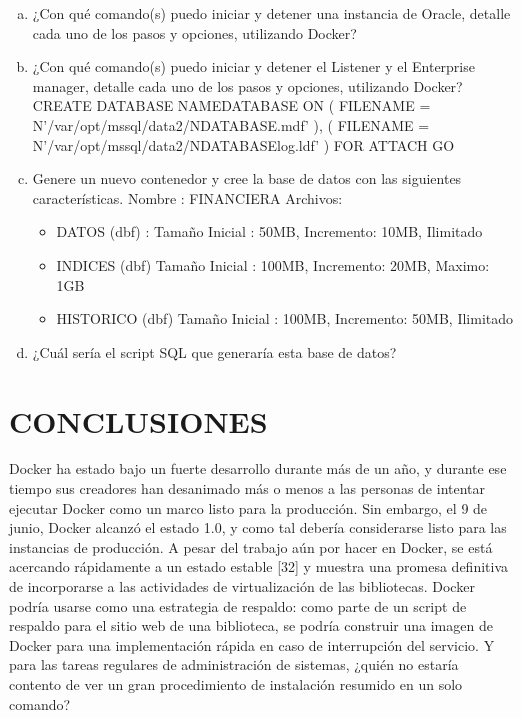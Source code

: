 \documentclass[preprint,12pt]{elsarticle}
\begin{document}
\begin{enumerate}[a)]
\item ¿Con qué comando(s) puedo iniciar y detener una instancia de Oracle, detalle cada uno de los pasos y opciones, utilizando Docker?\newline


\item ¿Con qué comando(s) puedo iniciar y detener el Listener y el Enterprise manager, detalle cada uno de los pasos y opciones, utilizando Docker?\newline
CREATE DATABASE NAMEDATABASE ON \newline
( FILENAME = N'/var/opt/mssql/data2/NDATABASE.mdf' ),\newline
( FILENAME = N'/var/opt/mssql/data2/NDATABASElog.ldf' )\newline
FOR ATTACH\newline
GO\newline
\item Genere un nuevo contenedor y cree la base de datos con las siguientes características.\newline
Nombre : FINANCIERA \newline
Archivos:
\begin{itemize}
\item DATOS (dbf) : Tamaño Inicial : 50MB, Incremento: 10MB, Ilimitado
\item INDICES (dbf) Tamaño Inicial : 100MB, Incremento: 20MB, Maximo: 1GB
\item HISTORICO (dbf) Tamaño Inicial : 100MB, Incremento: 50MB, Ilimitado
\end{itemize}
\item ¿Cuál sería el script SQL que generaría esta base de datos?
\begin{figure}[htb]
	\begin{center}
	\end{center}
\end{figure}
\end{enumerate}

\section{CONCLUSIONES}
Docker ha estado bajo un fuerte desarrollo durante más de un año, y durante ese tiempo sus creadores han desanimado más o menos a las personas de intentar ejecutar Docker como un marco listo para la producción. Sin embargo, el 9 de junio, Docker alcanzó el estado 1.0, y como tal debería considerarse listo para las instancias de producción.
A pesar del trabajo aún por hacer en Docker, se está acercando rápidamente a un estado estable [32] y muestra una promesa definitiva de incorporarse a las actividades de virtualización de las bibliotecas. Docker podría usarse como una estrategia de respaldo: como parte de un script de respaldo para el sitio web de una biblioteca, se podría construir una imagen de Docker para una implementación rápida en caso de interrupción del servicio. Y para las tareas regulares de administración de sistemas, ¿quién no estaría contento de ver un gran procedimiento de instalación resumido en un solo comando?
\end{document}
